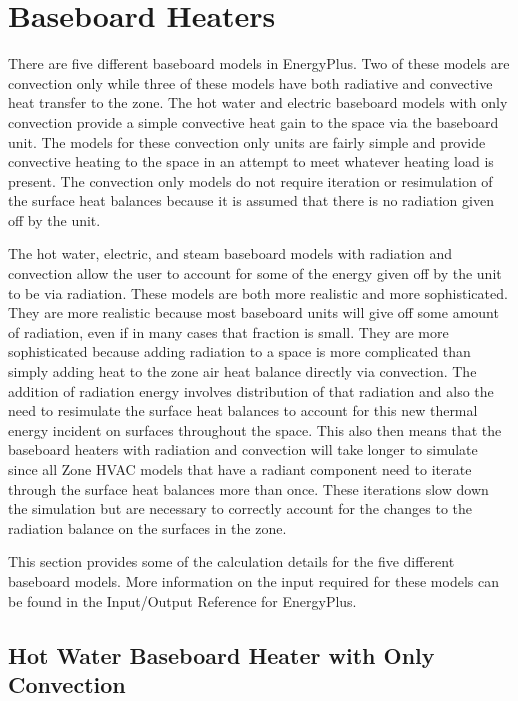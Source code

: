 \section{Baseboard Heaters }\label{baseboard-heaters}

There are five different baseboard models in EnergyPlus.  Two of these models are convection only while three of these models have both radiative and convective heat transfer to the zone.  The hot water and electric baseboard models with only convection provide a simple convective heat gain to the space via the baseboard unit.  The models for these convection only units are fairly simple and provide convective heating to the space in an attempt to meet whatever heating load is present.  The convection only models do not require iteration or resimulation of the surface heat balances because it is assumed that there is no radiation given off by the unit.

The hot water, electric, and steam baseboard models with radiation and convection allow the user to account for some of the energy given off by the unit to be via radiation.  These models are both more realistic and more sophisticated.  They are more realistic because most baseboard units will give off some amount of radiation, even if in many cases that fraction is small.  They are more sophisticated because adding radiation to a space is more complicated than simply adding heat to the zone air heat balance directly via convection.  The addition of radiation energy involves distribution of that radiation and also the need to resimulate the surface heat balances to account for this new thermal energy incident on surfaces throughout the space.  This also then means that the baseboard heaters with radiation and convection will take longer to simulate since all Zone HVAC models that have a radiant component need to iterate through the surface heat balances more than once.  These iterations slow down the simulation but are necessary to correctly account for the changes to the radiation balance on the surfaces in the zone.

This section provides some of the calculation details for the five different baseboard models.  More information on the input required for these models can be found in the Input/Output Reference for EnergyPlus.

\subsection{Hot Water Baseboard Heater with Only Convection}\label{hot-water-baseboard-heater-with-only-convection}

